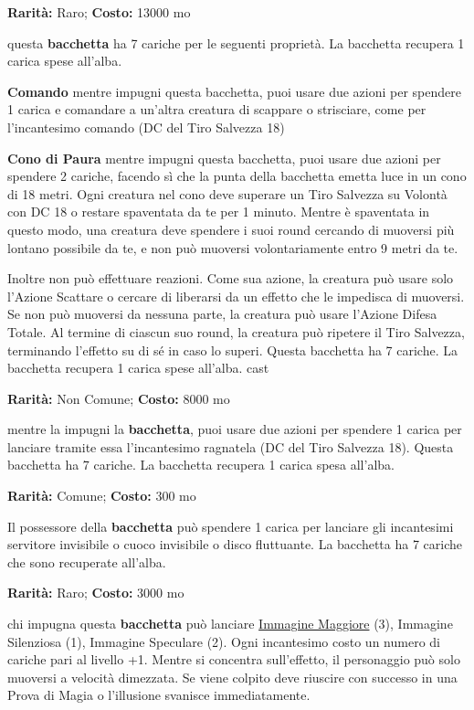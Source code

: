\begin{multicols}{2}

\textbf{Rarità:} Raro; \textbf{Costo:} 13000 mo

questa \textbf{bacchetta} ha 7 cariche per le seguenti proprietà. La bacchetta recupera 1 carica spese all'alba.

\textbf{Comando} mentre impugni questa bacchetta, puoi usare due azioni per spendere 1 carica e comandare a un'altra creatura di scappare o strisciare, come per l'incantesimo comando (DC del Tiro Salvezza 18)

\textbf{Cono di Paura} mentre impugni questa bacchetta, puoi usare due azioni per spendere 2 cariche, facendo sì che la punta della bacchetta emetta luce in un cono di 18 metri. Ogni creatura nel cono deve superare un Tiro Salvezza su Volontà con DC 18 o restare spaventata da te per 1 minuto. Mentre è spaventata in questo modo, una creatura deve spendere i suoi round cercando di muoversi più lontano possibile da te, e non può muoversi volontariamente entro 9 metri da te.

Inoltre non può effettuare reazioni. Come sua azione, la creatura può usare solo l'Azione Scattare o cercare di liberarsi da un effetto che le impedisca di muoversi. Se non può muoversi da nessuna parte, la creatura può usare l'Azione Difesa Totale. Al termine di ciascun suo round, la creatura può ripetere il Tiro Salvezza, terminando l'effetto su di sé in caso lo superi. Questa bacchetta ha 7 cariche. La bacchetta recupera 1 carica spese all'alba.
cast

\textbf{Rarità:} Non Comune; \textbf{Costo:} 8000 mo

mentre la impugni la \textbf{bacchetta}, puoi usare due azioni per spendere 1 carica per lanciare tramite essa l'incantesimo ragnatela (DC del Tiro Salvezza 18). Questa bacchetta ha 7 cariche. La bacchetta recupera 1 carica spesa all'alba.


\textbf{Rarità:} Comune; \textbf{Costo:} 300 mo

Il possessore della \textbf{bacchetta} può spendere 1 carica per lanciare gli incantesimi servitore invisibile o cuoco invisibile o disco fluttuante. La bacchetta ha 7 cariche che sono recuperate all'alba.


\textbf{Rarità:} Raro; \textbf{Costo:} 3000 mo

chi impugna questa \textbf{bacchetta} può lanciare \hyperlink{Immagine Maggiore}{Immagine Maggiore} (3), Immagine Silenziosa (1), Immagine Speculare (2). Ogni incantesimo costo un numero di cariche pari al livello +1. Mentre si concentra sull'effetto, il personaggio può solo muoversi a velocità dimezzata. Se viene colpito deve riuscire con successo in una Prova di Magia o l'illusione svanisce immediatamente.


\end{multicols}
